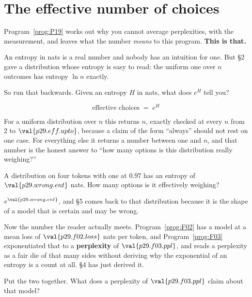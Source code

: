 \section{The effective number of choices}
\label{sec:P29-effective}

\begin{fr}
Program~\ref{prog:P19} works out why you cannot average perplexities, with the
measurement, and leaves what the number \emph{means} to this program.
\textbf{This is that.}

An entropy in nats is a real number and nobody has an intuition for one. But
§2 gave a distribution whose entropy is easy to read: the uniform one over $n$
outcomes has entropy $\ln n$ exactly.

So run that backwards. Given an entropy $H$ in nats, what does $e^{H}$ tell
you?
\dotline
\nextframe
\end{fr}

\begin{fr}

\[ \text{effective choices} \;=\; e^{H} \]

For a uniform distribution over $n$ this returns $n$, exactly \dash{} checked
at every $n$ from $2$ to $\val{p29.eff.upto}$, because a claim of the
form \enquote{always} should not rest on one case. For everything else it
returns a number between one and $n$, and that number is the honest answer to
\enquote{how many options is this distribution really weighing?}


A distribution on four tokens with one at $\num{0.97}$ has an entropy of
$\val{p29.wrong.ent}$ nats. How many options is it effectively weighing?
\dotline
\nextframe
\end{fr}

\begin{fr}

$e^{\val{p29.wrong.ent}}$, and §5 comes back to that distribution because it
is the shape of a model that is certain and may be wrong.

Now the number the reader actually meets. Program~\ref{prog:F02} has a model
at a mean loss of $\val{p29.f02.loss}$ nats per token, and
Program~\ref{prog:F03} exponentiated that to a \textbf{perplexity} of
$\val{p29.f03.ppl}$, and reads a perplexity as a fair die of that many sides
\dash{} without deriving why the exponential of an entropy is a count at all.
§4 has just derived it.

Put the two together. What does a perplexity of $\val{p29.f03.ppl}$ claim
about that model?
\dotline
\nextframe
\end{fr}

